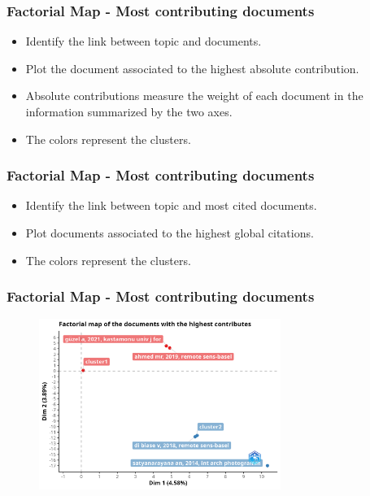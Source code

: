 \documentclass[aspectratio=169]{beamer}
\begin{document}
\begin{frame}
	\frametitle{Factorial Map - Most contributing documents}
	\begin{itemize}
		\item Identify the link between topic and documents.
		\item Plot the document associated to the highest absolute contribution.
		\item Absolute contributions measure the weight of each document in
		      the information summarized by the two axes.
		\item The colors represent the clusters.
	\end{itemize}
\end{frame}

\begin{frame}
	\frametitle{Factorial Map - Most contributing documents}
	\begin{itemize}
		\item Identify the link between topic and most cited documents.
		\item Plot documents associated to the highest global citations.
		\item The colors represent the clusters.
	\end{itemize}
\end{frame}

\begin{frame}
	\frametitle{Factorial Map - Most contributing documents}
	\begin{figure}
		\centering
		\includegraphics[width=0.7\textwidth]{figures/con_stru_map_contrib.png}
	\end{figure}
\end{frame}
\end{document}
